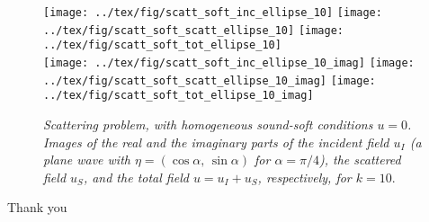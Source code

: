 \documentclass[handout]{beamer}
\begin{document}
\begin{frame}
\begin{center}
\begin{figure}
{
\texttt{[image: ../tex/fig/scatt\_soft\_inc\_ellipse\_10]}
}
{
\texttt{[image: ../tex/fig/scatt\_soft\_scatt\_ellipse\_10]}
}
{
\texttt{[image: ../tex/fig/scatt\_soft\_tot\_ellipse\_10]}
}
\\
{
\texttt{[image: ../tex/fig/scatt\_soft\_inc\_ellipse\_10\_imag]}
}
{
\texttt{[image: ../tex/fig/scatt\_soft\_scatt\_ellipse\_10\_imag]}
}
{
\texttt{[image: ../tex/fig/scatt\_soft\_tot\_ellipse\_10\_imag]}
}

\caption{\emph{Scattering problem, with homogeneous sound-soft conditions $u=0$. Images of the 
real and the imaginary parts
of the incident field $u_I$ (a plane wave with $\eta=(\cos\alpha,\, \sin\alpha)$ for $\alpha=\pi/4$), the scattered field 
$u_S$, and the total field $u=u_I + u_S$, respectively, for $k=10$}.}
\label{fig:scatt_soft_ellipse_10}
\end{figure}
\end{center}
\end{frame}
\begin{frame}[shrink=20]
\printbibliography %
\end{frame}
\begin{frame}
\begin{center}
\Large
 Thank you
\end{center}
\end{frame}
\end{document}
